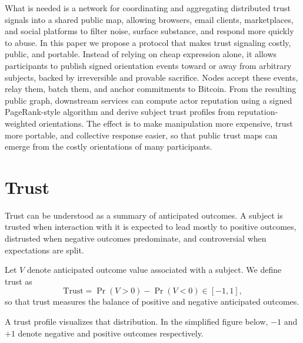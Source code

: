 \documentclass[11pt]{article}
\begin{document}
What is needed is a network for coordinating and aggregating distributed trust signals into a shared public map, allowing browsers, email clients, marketplaces, and social platforms to filter noise, surface substance, and respond more quickly to abuse. In this paper we propose a protocol that makes trust signaling costly, public, and portable. Instead of relying on cheap expression alone, it allows participants to publish signed orientation events toward or away from arbitrary subjects, backed by irreversible and provable sacrifice. Nodes accept these events, relay them, batch them, and anchor commitments to Bitcoin. From the resulting public graph, downstream services can compute actor reputation using a signed PageRank-style algorithm and derive subject trust profiles from reputation-weighted orientations. The effect is to make manipulation more expensive, trust more portable, and collective response easier, so that public trust maps can emerge from the costly orientations of many participants.

\section{Trust}

Trust can be understood as a summary of anticipated outcomes. A subject is trusted when interaction with it is expected to lead mostly to positive outcomes, distrusted when negative outcomes predominate, and controversial when expectations are split.

Let \(V\) denote anticipated outcome value associated with a subject. We define trust as
\[
\mathrm{Trust} = \Pr(V > 0) - \Pr(V < 0) \in [-1,1],
\]
so that trust measures the balance of positive and negative anticipated outcomes.

A trust profile visualizes that distribution. In the simplified figure below, \(-1\) and \(+1\) denote negative and positive outcomes respectively.
\end{document}
